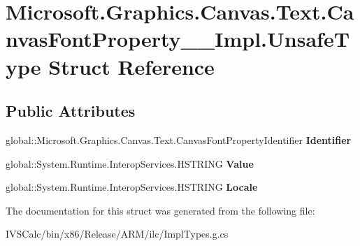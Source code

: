 \hypertarget{struct_microsoft_1_1_graphics_1_1_canvas_1_1_text_1_1_canvas_font_property_____impl_1_1_unsafe_type}{}\section{Microsoft.\+Graphics.\+Canvas.\+Text.\+Canvas\+Font\+Property\+\_\+\+\_\+\+Impl.\+Unsafe\+Type Struct Reference}
\label{struct_microsoft_1_1_graphics_1_1_canvas_1_1_text_1_1_canvas_font_property_____impl_1_1_unsafe_type}
\subsection*{Public Attributes}
\begin{DoxyCompactItemize}
\item 
\mbox{\label{struct_microsoft_1_1_graphics_1_1_canvas_1_1_text_1_1_canvas_font_property_____impl_1_1_unsafe_type_a9aed24cafb738552d12eb673cccbe5df}} 
global\+::\+Microsoft.\+Graphics.\+Canvas.\+Text.\+Canvas\+Font\+Property\+Identifier {\bfseries Identifier}
\item 
\mbox{\label{struct_microsoft_1_1_graphics_1_1_canvas_1_1_text_1_1_canvas_font_property_____impl_1_1_unsafe_type_a18a3d0c401d1c327868ad1eabaaa7d54}} 
global\+::\+System.\+Runtime.\+Interop\+Services.\+H\+S\+T\+R\+I\+NG {\bfseries Value}
\item 
\mbox{\label{struct_microsoft_1_1_graphics_1_1_canvas_1_1_text_1_1_canvas_font_property_____impl_1_1_unsafe_type_aaddca8abafce03fd71a4e9bb37845476}} 
global\+::\+System.\+Runtime.\+Interop\+Services.\+H\+S\+T\+R\+I\+NG {\bfseries Locale}
\end{DoxyCompactItemize}


The documentation for this struct was generated from the following file\+:\begin{DoxyCompactItemize}
\item 
I\+V\+S\+Calc/bin/x86/\+Release/\+A\+R\+M/ilc/Impl\+Types.\+g.\+cs\end{DoxyCompactItemize}
